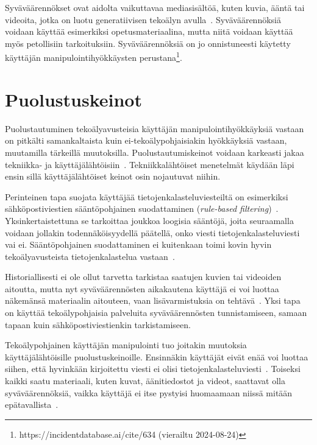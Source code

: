 \begin{otherlanguage}{finnish}

Syväväärennökset ovat aidolta vaikuttavaa mediasisältöä, kuten kuvia, ääntä tai videoita, jotka on luotu generatiivisen tekoälyn avulla~\citep{goodfellow_Generative_Adversarial_Networks_2020}. Syväväärennöksiä voidaan käyttää esimerkiksi opetusmateriaalina, mutta niitä voidaan käyttää myös petollisiin tarkoituksiin. Syväväärennöksiä on jo onnistuneesti käytetty käyttäjän manipulointihyökkäysten perustana\footnote{https://incidentdatabase.ai/cite/634 (vierailtu 2024-08-24)}.

\section*{Puolustuskeinot}

Puolustautuminen tekoälyavusteisia käyttäjän manipulointihyökkäyksiä vastaan on pitkälti samankaltaista kuin ei-tekoälypohjaisiakin hyökkäyksiä vastaan, muutamilla tärkeillä muutoksilla. Puolustautumiskeinot voidaan karkeasti jakaa tekniikka- ja käyttäjälähtöisiin~\citep{tsinganos_Towards_Automated_Recognition_Chat_SE_Enterprise_2018}. Tekniikkalähtöiset menetelmät käydään läpi ensin sillä käyttäjälähtöiset keinot osin nojautuvat niihin.

Perinteinen tapa suojata käyttäjää tietojenkalasteluviesteiltä on esimerkiksi sähköpostiviestien sääntöpohjainen suodattaminen (\textit{rule-based filtering})~\citep{mirsky_Threat_Offensive_AI_Organizations_2023}. Yksinkertaistettuna se tarkoittaa joukkoa loogisia sääntöjä, joita seuraamalla voidaan jollakin todennäköisyydellä päätellä, onko viesti tietojenkalasteluviesti vai ei. Sääntöpohjainen suodattaminen ei kuitenkaan toimi kovin hyvin tekoälyavusteista tietojenkalastelua vastaan~\citep{fakhouri_AI_Driven_Solutions_SE_Attacks_2024}.

Historiallisesti ei ole ollut tarvetta tarkistaa saatujen kuvien tai videoiden aitoutta, mutta nyt syväväärennösten aikakautena käyttäjä ei voi luottaa näkemänsä materiaalin aitouteen, vaan lisävarmistuksia on tehtävä~\citep{mirsky_Creation_Detection_Deepfakes_2021}. Yksi tapa on käyttää tekoälypohjaisia palveluita syväväärennösten tunnistamiseen, samaan tapaan kuin sähköpostiviestienkin tarkistamiseen.


Tekoälypohjainen käyttäjän manipulointi tuo joitakin muutoksia käyttäjälähtöisille puolustuskeinoille. Ensinnäkin käyttäjät eivät enää voi luottaa siihen, että hyvinkään kirjoitettu viesti ei olisi tietojenkalasteluviesti~\citep{gupta_From_ChatGPT_to_ThreatGPT_2023}. Toiseksi kaikki saatu materiaali, kuten kuvat, äänitiedostot ja videot, saattavat olla syväväärennöksiä, vaikka käyttäjä ei itse pystyisi huomaamaan niissä mitään epätavallista~\citep{blauth_AI_Crime_Overview_Malicious_Use_Abuse_2022}.




\end{otherlanguage}
